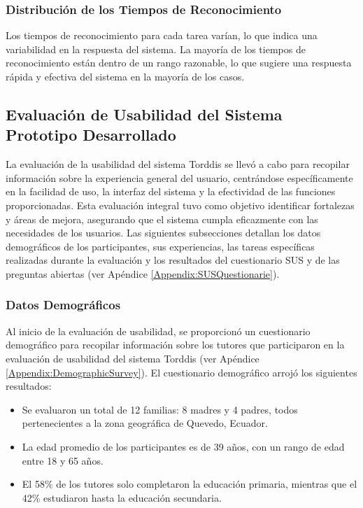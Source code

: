 \documentclass[a4paper,fleqn]{cas-sc}
\begin{document}
			\subsubsection{Distribución de los Tiempos de Reconocimiento}
				Los tiempos de reconocimiento para cada tarea varían, lo que indica una variabilidad en la respuesta del sistema. La mayoría de los tiempos de reconocimiento están dentro de un rango razonable, lo que sugiere una respuesta rápida y efectiva del sistema en la mayoría de los casos.
		
		\subsection{Evaluación de Usabilidad del Sistema Prototipo Desarrollado}
			La evaluación de la usabilidad del sistema Torddis se llevó a cabo para recopilar información sobre la experiencia general del usuario, centrándose específicamente en la facilidad de uso, la interfaz del sistema y la efectividad de las funciones proporcionadas. Esta evaluación integral tuvo como objetivo identificar fortalezas y áreas de mejora, asegurando que el sistema cumpla eficazmente con las necesidades de los usuarios. Las siguientes subsecciones detallan los datos demográficos de los participantes, sus experiencias, las tareas específicas realizadas durante la evaluación y los resultados del cuestionario SUS y de las preguntas abiertas (ver Apéndice \ref{Appendix:SUSQuestionarie}).
			
			\subsubsection{Datos Demográficos}
				Al inicio de la evaluación de usabilidad, se proporcionó un cuestionario demográfico para recopilar información sobre los tutores que participaron en la evaluación de usabilidad del sistema Torddis (ver Apéndice \ref{Appendix:DemographicSurvey}). El cuestionario demográfico arrojó los siguientes resultados:
				
				\begin{itemize}
					\item Se evaluaron un total de 12 familias: 8 madres y 4 padres, todos pertenecientes a la zona geográfica de Quevedo, Ecuador.
					\item La edad promedio de los participantes es de 39 años, con un rango de edad entre 18 y 65 años.
					\item El 58\% de los tutores solo completaron la educación primaria, mientras que el 42\% estudiaron hasta la educación secundaria.
				\end{itemize}
				
\end{document}
